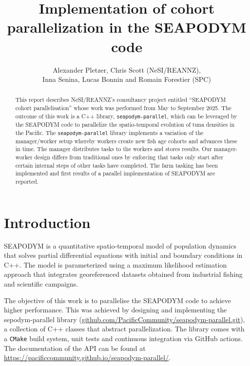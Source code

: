 \documentclass[a4paper,oneside,12pt]{article}
\begin{document}
\author{Alexander Pletzer, Chris Scott (NeSI/REANNZ), \\
Inna Senina, Lucas Bonnin and Romain Forestier (SPC)}
\title{Implementation of cohort parallelization in the SEAPODYM code}

\maketitle

\begin{abstract}
This report describes NeSI/REANNZ's consultancy project entitled ``SEAPODYM cohort parallelisation'' 
whose work was performed from May to September 2025. The outcome of this work is a C++ library,
\verb|seapodym-parallel|, which can be leveraged by the SEAPODYM code to parallelize the spatio-temporal
evolution of tuna densities in the Pacific. The \verb|seapodym-parallel| library implements a 
variation of the manager/worker setup whereby workers create new fish age cohorts and advances these in time. 
The manager distributes tasks to the workers and stores results. 
Our manager-worker design differs from traditional ones by enforcing that tasks only start after certain 
internal steps of other tasks have completed. The farm tasking has been implemented and first results of a 
parallel implementation of SEAPODYM are reported. 
\end{abstract}


\pagestyle{plain}


\section{Introduction}

SEAPODYM is a quantitative spatio-temporal model
of population dynamics that solves partial differential
equations with initial and boundary conditions in C++. 
The model is parameterized using a maximum
likelihood estimation approach that integrates georeferenced 
datasets obtained from industrial fishing and scientific campaigns.

The objective of this work is to parallelise the SEAPODYM code to achieve higher performance. 
This was achieved by designing and implementing the sepodym-parallel library 
(\url{github.com/PacificCommunity/seapodym-parallel.git}), a collection of 
C++ classes that abstract parallelization. The library comes with a 
\verb|CMake| build system, unit tests and continuous integration via 
GitHub actions. The documentation of the API can be found at 
\url{https://pacificcommunity.github.io/seapodym-parallel/}.
\end{document}
